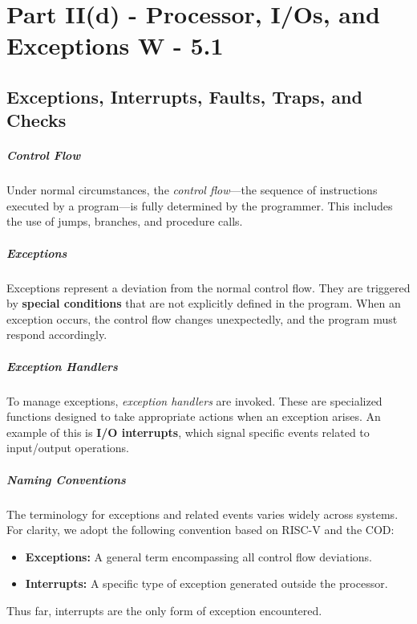 \chapter{Part II(d) - Processor, I/Os, and Exceptions W - 5.1}

\section{Exceptions, Interrupts, Faults, Traps, and Checks}

\paragraph{Control Flow}
Under normal circumstances, the \textit{control flow}—the sequence of instructions executed by a program—is fully determined by the programmer. This includes the use of jumps, branches, and procedure calls.

\paragraph{Exceptions}
Exceptions represent a deviation from the normal control flow. They are triggered by \textbf{special conditions} that are not explicitly defined in the program. When an exception occurs, the control flow changes unexpectedly, and the program must respond accordingly.

\paragraph{Exception Handlers}
To manage exceptions, \textit{exception handlers} are invoked. These are specialized functions designed to take appropriate actions when an exception arises. An example of this is \textbf{I/O interrupts}, which signal specific events related to input/output operations.

\paragraph{Naming Conventions}
The terminology for exceptions and related events varies widely across systems. For clarity, we adopt the following convention based on RISC-V and the COD:
\begin{itemize}
    \item \textbf{Exceptions:} A general term encompassing all control flow deviations.
    \item \textbf{Interrupts:} A specific type of exception generated outside the processor.
\end{itemize}
Thus far, interrupts are the only form of exception encountered.
\newpage
